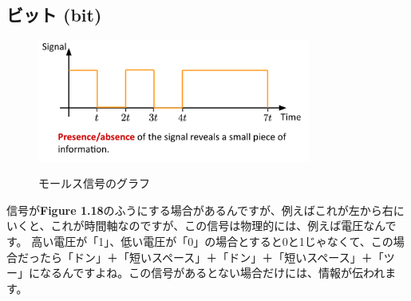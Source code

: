 \subsection{ビット (bit)}
\begin{figure}[H]
    \centering
    \includegraphics[width=0.8\textwidth]{lesson1/presence_abscence.pdf}
    \label{fig: 1}
    \begin{center}
        \caption{モールス信号のグラフ}
    \end{center}
\end{figure}
信号が\textbf{Figure 1.18}のふうにする場合があるんですが、例えばこれが左から右にいくと、これが時間軸なのですが、この信号は物理的には、例えば電圧なんです。
高い電圧が「1」、低い電圧が「0」の場合とすると0と1じゃなくて、この場合だったら「ドン」＋「短いスペース」＋「ドン」＋「短いスペース」＋「ツー」になるんですよね。この信号があるとない場合だけには、情報が伝われます。

